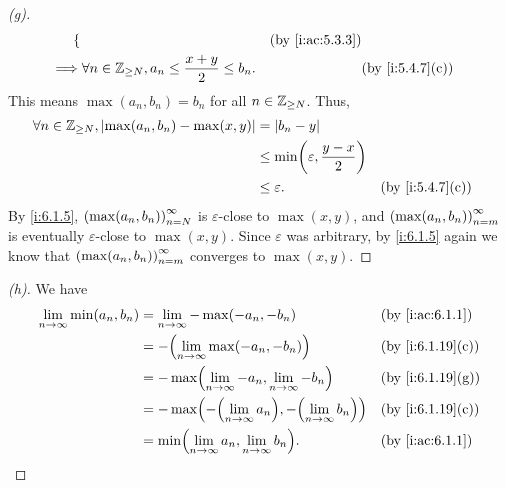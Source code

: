 \begin{proof}[(g)]
\begin{align*}
\begin{dcases}
                                          \end{dcases}                                                 &  & \by{i:ac:5.3.3}      \\
    \implies & \forall n \in \Z_{\geq N}, a_n \leq \dfrac{x + y}{2} \leq b_n.                            &  & \by{i:5.4.7}[c]
  \end{align*}
  This means \(\max(a_n, b_n) = b_n\) for all \(n \in \mathbb{Z}_{\geq N}\).
  Thus,
  \begin{align*}
    \forall n \in \Z_{\geq N}, \abs{\max(a_n, b_n) - \max(x, y)} & = \abs{b_n - y}                                                  \\
                                                                 & \leq \min\pa{\varepsilon, \dfrac{y - x}{2}}                      \\
                                                                 & \leq \varepsilon.                           &  & \by{i:5.4.7}[c]
  \end{align*}
  By \cref{i:6.1.5}, \(\left\lparen\max(a_n, b_n)\right\rparen_{n = N}^\infty\) is \(\varepsilon\)-close to \(\max(x, y)\), and \(\left\lparen\max(a_n, b_n)\right\rparen_{n = m}^\infty\) is eventually \(\varepsilon\)-close to \(\max(x, y)\).
  Since \(\varepsilon\) was arbitrary, by \cref{i:6.1.5} again we know that \(\left\lparen\max(a_n, b_n)\right\rparen_{n = m}^\infty\) converges to \(\max(x, y)\).
\end{proof}

\begin{proof}[(h)]
  We have
  \begin{align*}
    \lim_{n \to \infty} \min(a_n, b_n) & = \lim_{n \to \infty} -\max(-a_n, -b_n)                                  &  & \by{i:ac:6.1.1}  \\
                                       & = -\pa{\lim_{n \to \infty} \max(-a_n, -b_n)}                             &  & \by{i:6.1.19}[c] \\
                                       & = -\max\pa{\lim_{n \to \infty} -a_n, \lim_{n \to \infty} -b_n}           &  & \by{i:6.1.19}[g] \\
                                       & = -\max\pa{-\pa{\lim_{n \to \infty} a_n}, -\pa{\lim_{n \to \infty} b_n}} &  & \by{i:6.1.19}[c] \\
                                       & = \min\pa{\lim_{n \to \infty} a_n, \lim_{n \to \infty} b_n}.             &  & \by{i:ac:6.1.1}
  \end{align*}
\end{proof}


